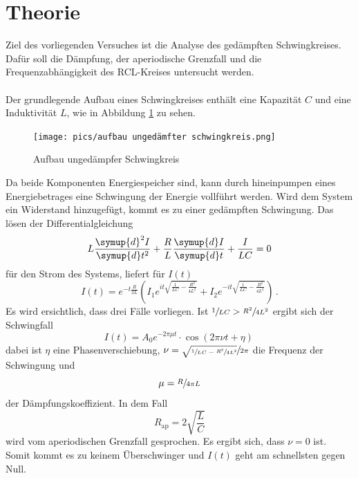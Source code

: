 \section{Theorie}
\label{sec:Theorie}
Ziel des vorliegenden Versuches ist die Analyse des gedämpften Schwingkreises.
Dafür soll die Dämpfung, der aperiodische Grenzfall und die Frequenzabhängigkeit des RCL-Kreises untersucht werden.\\
\\
Der grundlegende Aufbau eines Schwingkreises enthält eine Kapazität $C$ und eine Induktivität $L$, wie in Abbildung \ref{fig:unged} zu sehen.
\begin{figure}
    \centering
    \caption{Aufbau ungedämpfer Schwingkreis \cite{}} 
    \label{fig:unged}
    \texttt{[image: pics/aufbau ungedämfter schwingkreis.png]}
\end{figure}
Da beide Komponenten Energiespeicher sind, kann durch hineinpumpen eines Energiebetrages eine Schwingung der Energie vollführt werden.
Wird dem System ein Widerstand hinzugefügt, kommt es zu einer gedämpften Schwingung. Das lösen der Differentialgleichung
\begin{equation}
    L \frac{\symup{d}^2 I}{\symup{d} t^2} + \frac{R}{L} \frac{\symup{d} I}{\symup{d} t} + \frac{I}{LC}=0
    \label{eqn:DGL}
\end{equation}
für den Strom des Systems, liefert für $I(t)$
\begin{equation}
    I(t)=e^{-t \frac{R}{2L}} \left(I_1 e^{i t \sqrt{\frac{1}{L C} - \frac{R^2}{4 L^2}}}+ I_2 e^{-i t \sqrt{\frac{1}{L C} - \frac{R^2}{4 L^2}}} \right) \, .
\end{equation}
Es wird ersichtlich, dass drei Fälle vorliegen. Ist $ \sfrac{1}{LC}> \sfrac{R^2}{4 L^2}$ ergibt sich der Schwingfall
\begin{equation}
    I(t)=A_0 e^{- 2 \pi \mu t} \cdot \cos(2 \pi \nu t + \eta) \, 
\end{equation}
dabei ist $\eta$ eine Phasenverschiebung, $\nu=\sfrac{\sqrt{\sfrac{1}{L C}-\sfrac{R^2}{4 L^2}}}{2 \pi}$ die Frequenz der Schwingung und
\begin{equation}
    \mu=\sfrac{R}{4 \pi L}
    \label{eqn:muuh}
\end{equation}
der Dämpfungskoeffizient.
In dem Fall 
\begin{equation}
    R_\text{ap}=2 \sqrt{\frac{L}{C}}
    \label{eqn:apbed}
\end{equation}
wird vom aperiodischen Grenzfall gesprochen. Es ergibt sich, dass $\nu = 0$ ist. Somit kommt es zu keinem Überschwinger und $I(t)$ geht am schnellsten gegen Null.\\

